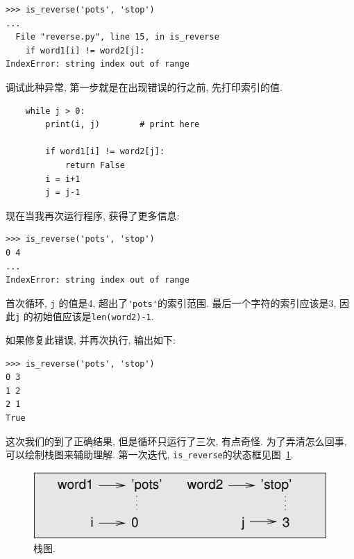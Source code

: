 \documentclass[10pt]{book}
\begin{document}
\begin{verbatim}
>>> is_reverse('pots', 'stop')
...
  File "reverse.py", line 15, in is_reverse
    if word1[i] != word2[j]:
IndexError: string index out of range
\end{verbatim}
%
调试此种异常, 第一步就是在出现错误的行之前, 先打印索引的值. 

\begin{verbatim}
    while j > 0:
        print(i, j)        # print here
        
        if word1[i] != word2[j]:
            return False
        i = i+1
        j = j-1
\end{verbatim}
%
现在当我再次运行程序, 获得了更多信息:

\begin{verbatim}
>>> is_reverse('pots', 'stop')
0 4
...
IndexError: string index out of range
\end{verbatim}
%
首次循环,  {\tt j} 的值是4,
超出了\verb"'pots'"的索引范围. 
最后一个字符的索引应该是3,
因此{\tt j} 的初始值应该是{\tt len(word2)-1}.


如果修复此错误, 并再次执行, 输出如下:

\begin{verbatim}
>>> is_reverse('pots', 'stop')
0 3
1 2
2 1
True
\end{verbatim}
%
这次我们的到了正确结果, 但是循环只运行了三次, 有点奇怪. 
为了弄清怎么回事, 可以绘制栈图来辅助理解. 
第一次迭代, \verb"is_reverse"的状态框见图~\ref{fig.state4}.  
 

\begin{figure}
\centerline
{\includegraphics[scale=0.8]{figs/state4.pdf}}
\caption{栈图.}
\label{fig.state4}
\end{figure}
\end{document}
